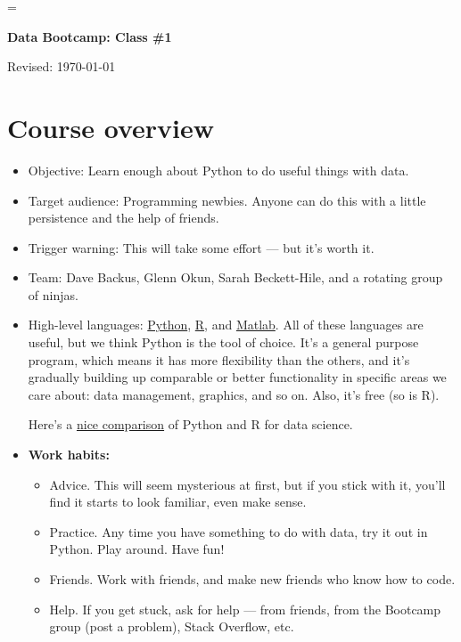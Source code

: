 \documentclass[11pt]{article}
\begin{document}
\parskip=\bigskipamount
\parindent=0.0in
\thispagestyle{empty}


\bigskip\bigskip
\centerline{\Large \bf Data Bootcamp:  Class \#1}
\centerline{Revised: \today}


\section{Course overview}

\begin{itemize}
\item Objective:  Learn enough about Python to do useful things with data.
\item Target audience:  Programming newbies.
Anyone can do this with a little persistence and the help of friends.
\item Trigger warning:  This will take some effort ---  but it's worth it.
\item Team:  Dave Backus, Glenn Okun, Sarah Beckett-Hile, and a rotating group of ninjas.

\item High-level languages:
\href{http://en.wikipedia.org/wiki/Python_(programming_language)}{Python},
\href{http://en.wikipedia.org/wiki/R_(programming_language)}{R},
and
\href{http://en.wikipedia.org/wiki/MATLAB}{Matlab}.
All of these languages are useful, but we think Python is the tool of choice.
It's a general purpose program, which means it has more flexibility than the others,
and it's gradually building up comparable or better functionality in specific areas we care about:
data management, graphics, and so on.
Also, it's free (so is R).

Here's a
\href{http://www.dataschool.io/python-or-r-for-data-science/}{nice comparison}
of Python and R for data science.

\item {\bf Work habits:}
\begin{itemize}
\item Advice.  This will seem mysterious at first, but if you stick with it,
you'll find it starts to look familiar, even make sense.
\item Practice.  Any time you have something to do with data, try it out in Python.
Play around.  Have fun!
\item Friends.  Work with friends, and make new friends who know how to code.
\item Help.  If you get stuck, ask for help --- from friends,
from the Bootcamp group (post a problem), Stack Overflow, etc.
\end{itemize}


\end{itemize}
\end{document}
